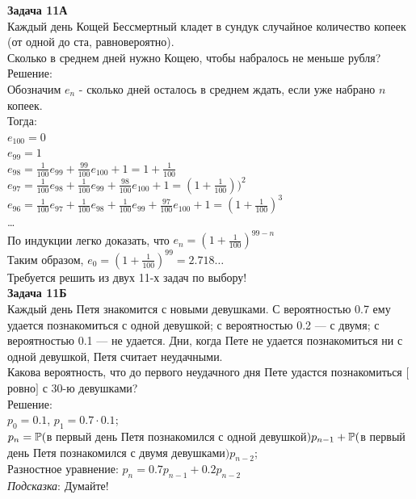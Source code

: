 \documentclass[12pt, a4paper]{article}\usepackage[]{graphicx}\usepackage[]{color}
\begin{document}
\textbf{Задача 11А} \\
Каждый день Кощей Бессмертный кладет в сундук случайное количество
копеек (от одной до ста, равновероятно). \\
Сколько в среднем дней нужно Кощею, чтобы набралось не меньше рубля? \\
Решение: \\
Обозначим $e_{n}$ - сколько дней осталось в среднем ждать, если
уже набрано $n$ копеек. \\
Тогда: \\
$e_{100}=0$ \\
$e_{99}=1$ \\
$e_{98}=\frac{1}{100}e_{99}+\frac{99}{100}e_{100}+1=1+\frac{1}{100}$\\
$e_{97}=\frac{1}{100}e_{98}+\frac{1}{100}e_{99}+\frac{98}{100}e_{100}+1=(1+\frac{1}{100}))^{2}$
\\
$e_{96}=\frac{1}{100}e_{97}+\frac{1}{100}e_{98}+\frac{1}{100}e_{99}+\frac{97}{100}e_{100}+1=(1+\frac{1}{100})^{3}$
\\
\ldots \\
По индукции легко доказать, что $e_{n}=(1+\frac{1}{100})^{99-n}$ \\
Таким образом, $e_{0}=(1+\frac{1}{100})^{99}=2.718\ldots$ \\

Требуется решить \textbf{} из двух 11-х задач по
выбору! \\



\textbf{Задача 11Б} \\
Каждый день Петя знакомится с новыми девушками. С вероятностью 0.7
ему удается познакомиться с одной девушкой; с вероятностью 0.2 — с
двумя; с вероятностью 0.1 — не удается. Дни, когда Пете не удается
познакомиться ни с одной девушкой, Петя считает неудачными. \\
Какова вероятность, что до первого неудачного дня Пете удастся
познакомиться $[$ровно$]$ с 30-ю девушками? \\
Решение: \\
$p_{0}=0.1$, $p_{1}=0.7\cdot 0.1$; \\
$p_{n}=\P($в первый день Петя познакомился с одной
девушкой$)p_{n-1}+\P($в первый день Петя познакомился с двумя
девушками$)p_{n-2}$; \\
Разностное уравнение: $p_{n}=0.7p_{n-1}+0.2p_{n-2}$ \\


\emph{Подсказка}: Думайте! \\
\end{document}
